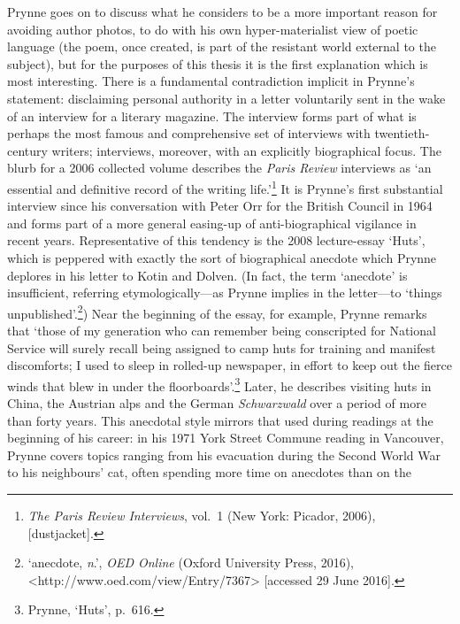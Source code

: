 \documentclass[]{article}
\begin{document}
\noindent Prynne goes on to discuss what he considers to be a more
important reason for avoiding author photos, to do with his own
hyper-materialist view of poetic language (the poem, once created, is
part of the resistant world external to the subject), but for the
purposes of this thesis it is the first explanation which is most
interesting. There is a fundamental contradiction implicit in Prynne’s
statement: disclaiming personal authority in a letter voluntarily sent
in the wake of an interview for a literary magazine. The interview forms
part of what is perhaps the most famous and comprehensive set of
interviews with twentieth-century writers; interviews, moreover, with an
explicitly biographical focus. The blurb for a 2006 collected volume
describes the \emph{Paris Review} interviews as ‘an essential and
definitive record of the writing life.’\footnote{\emph{The Paris Review
  Interviews}, vol.~1 (New York: Picador, 2006), {[}dustjacket{]}.} It
is Prynne’s first substantial interview since his conversation with
Peter Orr for the British Council in 1964 and forms part of a more
general easing-up of anti-biographical vigilance in recent years.
Representative of this tendency is the 2008 lecture-essay ‘Huts’, which
is peppered with exactly the sort of biographical anecdote which Prynne
deplores in his letter to Kotin and Dolven. (In fact, the term
‘anecdote’ is insufficient, referring etymologically—as Prynne implies
in the letter—to ‘things unpublished’.\footnote{‘anecdote, \emph{n}.’,
  \emph{OED Online} (Oxford University Press, 2016),
  \textless{}http://www.oed.com/view/Entry/7367\textgreater{}
  {[}accessed 29 June 2016{]}.}) Near the beginning of the essay, for
example, Prynne remarks that ‘those of my generation who can remember
being conscripted for National Service will surely recall being assigned
to camp huts for training and manifest discomforts; I used to sleep in
rolled-up newspaper, in effort to keep out the fierce winds that blew in
under the floorboards’.\footnote{Prynne, ‘Huts’, p.~616.} Later, he
describes visiting huts in China, the Austrian alps and the German
\emph{Schwarzwald} over a period of more than forty years. This
anecdotal style mirrors that used during readings at the beginning of
his career: in his 1971 York Street Commune reading in Vancouver, Prynne
covers topics ranging from his evacuation during the Second World War to
his neighbours’ cat, often spending more time on anecdotes than on the
\end{document}
